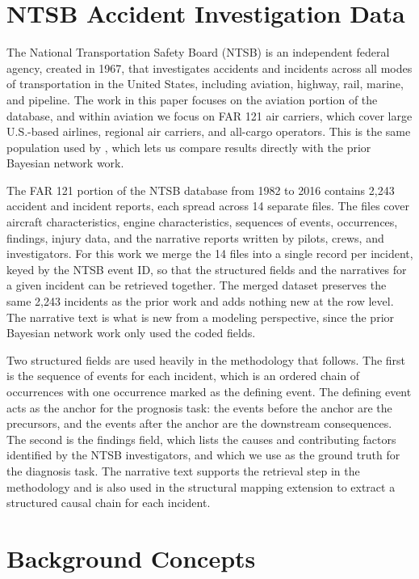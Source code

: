 \documentclass[11pt]{article}
\begin{document}
\section{NTSB Accident Investigation Data}
\label{sec:data}

The National Transportation Safety Board (NTSB) is an independent federal agency, created in 1967, that investigates accidents and incidents across all modes of transportation in the United States, including aviation, highway, rail, marine, and pipeline. The work in this paper focuses on the aviation portion of the database, and within aviation we focus on FAR 121 air carriers, which cover large U.S.-based airlines, regional air carriers, and all-cargo operators. This is the same population used by \citet{ZhangMahadevan2021}, which lets us compare results directly with the prior Bayesian network work.

The FAR 121 portion of the NTSB database from 1982 to 2016 contains 2,243 accident and incident reports, each spread across 14 separate files. The files cover aircraft characteristics, engine characteristics, sequences of events, occurrences, findings, injury data, and the narrative reports written by pilots, crews, and investigators. For this work we merge the 14 files into a single record per incident, keyed by the NTSB event ID, so that the structured fields and the narratives for a given incident can be retrieved together. The merged dataset preserves the same 2,243 incidents as the prior work and adds nothing new at the row level. The narrative text is what is new from a modeling perspective, since the prior Bayesian network work only used the coded fields.

Two structured fields are used heavily in the methodology that follows. The first is the sequence of events for each incident, which is an ordered chain of occurrences with one occurrence marked as the defining event. The defining event acts as the anchor for the prognosis task: the events before the anchor are the precursors, and the events after the anchor are the downstream consequences. The second is the findings field, which lists the causes and contributing factors identified by the NTSB investigators, and which we use as the ground truth for the diagnosis task. The narrative text supports the retrieval step in the methodology and is also used in the structural mapping extension to extract a structured causal chain for each incident.

\section{Background Concepts}
\label{sec:background}
\end{document}
